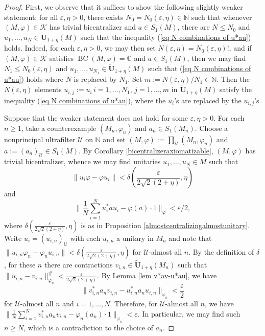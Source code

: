 \documentclass[12pt]{amsart}
\theoremstyle{definition}
\newcommand{\C}{\mathbb{C}}
\newcommand{\N}{\mathbb{N}}
\newcommand{\ep}{\varepsilon}
\def\cal{\mathcal}
\def\u{\mathsf 1}
\newcommand\cU{{\cal U}}
\def \u{\mathcal U}
\def\BC{\operatorname{BC}}
\begin{document}
\begin{proof}
First, we observe that it suffices to show the following slightly weaker statement: for all $\ep,\eta>0$, there exists $N_0=N_0(\ep,\eta)\in \N$ such that whenever $(M,\varphi)\in \mathcal{K}$ has trivial bicentralizer and $a\in S_1(M)$, there are $N\le N_0$ and $u_1,\dots, u_N\in \tilde{\mathbf{U}}_{1+\eta}(M)$ such that the inequality (\ref{eq N combinations of u*au}) holds. Indeed, for each $\ep,\eta>0$, we may then set $N(\ep,\eta)=N_0(\ep,\eta)!$, and if $(M,\varphi)\in \mathcal{K}$ satisfies $\BC(M,\varphi)=\C$ and $a\in S_1(M)$, then we may find $N_1\le N_0(\ep,\eta)$ and $u_1,\dots,u_{N_1}\in \tilde{\mathbf{U}}_{1+\eta}(M)$ such that (\ref{eq N combinations of u*au}) holds where $N$ is replaced by $N_1$. Set $m:=N(\ep,\eta)/N_1\in \N$.  Then the $N(\ep,\eta)$ elements $u_{i,j}:=u_i\, i=1,\dots,N_1,\,j=1,\dots,m$ in $\tilde{\mathbf{U}}_{1+\eta}(M)$ satisfy the  
inequality (\ref{eq N combinations of u*au}), where the $u_i$'s are replaced by the $u_{i,j}$'s. 

Suppose that the weaker statement does not hold for some $\ep,\eta>0$.  For each $n\geq 1$, take a counterexample $(M_n,\varphi_n)$ and $a_n\in S_1(M_n)$.  Choose a nonprincipal ultrafilter $\cU$ on $\N$ and set $(M,\varphi):=\prod_\u (M_n,\varphi_n)$ and $a:=(a_n)_\u\in S_1(M)$.  By Corollary \ref{bicentralizeraxiomatizable}, $(M,\varphi)$ has trivial bicentralizer, whence we may find unitaries $u_1,\ldots,u_N\in M$ such that $$\|u_i\varphi-\varphi u_i\|<\delta\left(\frac{\ep}{2\sqrt{2}(2+\eta)},\eta\right)$$ and $$\|\frac{1}{N}\sum_{i=1}^N u_i^*au_i-\varphi(a)\cdot 1\|_\varphi<\ep/2,$$ where $\delta(\frac{\ep}{2\sqrt{2}(2+\eta)},\eta)$ is as in Proposition \ref{almostcentralizingalmostunitary}.  Write $u_i=(u_{i,n})_\u$ with each $u_{i,n}$ a unitary in $M_n$ and note that $\|u_{i,n}\varphi_n-\varphi_n u_{i,n}\|<\delta(\frac{\ep}{2\sqrt{2}(2+\eta)},\eta)$ for $\u$-almost all $n$.  By the definition of $\delta$, for these $n$ there are contractions $v_{i,n}\in \tilde{\mathbf{U}}_{1+\eta}(M_n)$ such that $\|u_{i,n}-v_{i,n}\|_{\varphi_n}^\#<\frac{\ep}{2\sqrt{2}(2+\eta)}$.  By Lemma \ref{lem v*av-u*au}, we have $$\|v_{i,n}^*a_nv_{i,n}-u_{i,n}^*a_nu_{i,n}\|_{\varphi_n}<\frac{\ep}{2}$$ for $\cU$-almost all $n$ and $i=1,\dots, N$. Therefore, for $\u$-almost all $n$, we have $\|\frac{1}{N}\sum_{i=1}^N v_{i,n}^*a_nv_{i,n}-\varphi_n(a_n)\cdot 1\|_{\varphi_n}<\ep$. In particular, we may find such $n\ge N$, which is a contradiction to the choice of $a_n$.
\end{proof}
\end{document}
